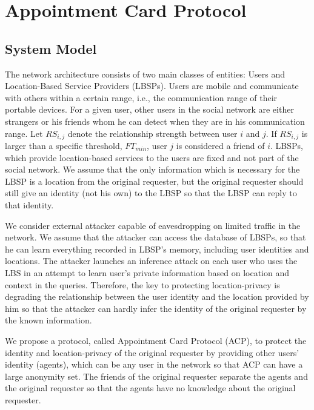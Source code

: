 


\chapter{ Appointment Card Protocol}
\label{CACP}
 
\section{ System Model}

\noindent The network architecture consists of two main classes of entities: Users and Location-Based Service Providers (LBSPs). Users are mobile and communicate with others within a certain range, i.e., the communication range of their portable devices. For a given user, other users in the social network are either strangers or his friends whom he can detect when they are in his communication range. Let ${RS}_{i,j}$ denote the relationship strength between user $i$ and $j$. If ${RS}_{i,j}$ is larger than a specific threshold, ${FT}_{min}$, user $j$ is considered a friend of $i$. LBSPs, which provide location-based services to the users are fixed and not part of the social network. We assume that the only information which is necessary for the LBSP is a location from the original requester, but the original requester should still give an identity (not his own) to the LBSP so that the LBSP can reply to that identity.

We consider external attacker capable of eavesdropping on limited traffic in the network. We assume that the attacker can access the database of LBSPs, so that he can learn everything recorded in LBSP's memory, including user identities and locations. The attacker launches an inference attack on each user who uses the LBS in an attempt to learn user's private information based on location and context in the queries. Therefore, the key to protecting location-privacy is degrading the relationship between the user identity and the location provided by him so that the attacker can hardly infer the identity of the original requester by the known information. 

We propose a protocol, called Appointment Card Protocol (ACP), to protect the identity and location-privacy of the original requester by providing other users' identity (agents), which can be any user in the network so that ACP can have a large anonymity set. The friends of the original requester separate the agents and the original requester so that the agents have no knowledge about the original requester.


